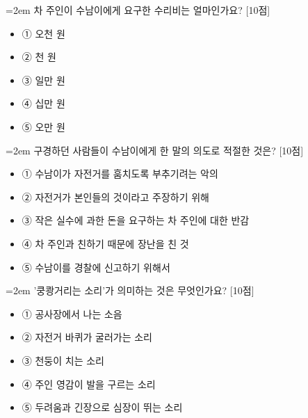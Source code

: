 \documentclass[12pt,a4paper]{article}
\newcommand{\qnum}[1]{%
  \tikz[baseline=(num.base)]{%
    \node[circle, fill=numCircle, text=white, inner sep=0pt,
          minimum size=18pt, font=\small\bfseries] (num) {#1};%
  }%
}
\newcommand{\pts}[1]{%
  \hfill\textcolor{ptsBadge}{[#1점]}%
}
\begin{document}
\vspace{4mm}
\begin{minipage}{\columnwidth}
{\hangindent=2em
\qnum{5}\enspace 차 주인이 수남이에게 요구한 수리비는 얼마인가요? \pts{10}
\par}

\vspace{3mm}
\begin{itemize}[leftmargin=2.5em, labelsep=0.3em, label={}, itemsep=4pt, parsep=1pt, topsep=0pt]
  \item ① 오천 원
  \item ② 천 원
  \item ③ 일만 원
  \item ④ 십만 원
  \item ⑤ 오만 원
\end{itemize}
\end{minipage}
\vspace{4mm}

\vspace{4mm}
\begin{minipage}{\columnwidth}
{\hangindent=2em
\qnum{6}\enspace 구경하던 사람들이 수남이에게 한 말의 의도로 적절한 것은? \pts{10}
\par}

\vspace{3mm}
\begin{itemize}[leftmargin=2.5em, labelsep=0.3em, label={}, itemsep=4pt, parsep=1pt, topsep=0pt]
  \item ① 수남이가 자전거를 훔치도록 부추기려는 악의
  \item ② 자전거가 본인들의 것이라고 주장하기 위해
  \item ③ 작은 실수에 과한 돈을 요구하는 차 주인에 대한 반감
  \item ④ 차 주인과 친하기 때문에 장난을 친 것
  \item ⑤ 수남이를 경찰에 신고하기 위해서
\end{itemize}
\end{minipage}
\vspace{4mm}

\vspace{4mm}
\begin{minipage}{\columnwidth}
{\hangindent=2em
\qnum{7}\enspace '쿵쾅거리는 소리'가 의미하는 것은 무엇인가요? \pts{10}
\par}

\vspace{3mm}
\begin{itemize}[leftmargin=2.5em, labelsep=0.3em, label={}, itemsep=4pt, parsep=1pt, topsep=0pt]
  \item ① 공사장에서 나는 소음
  \item ② 자전거 바퀴가 굴러가는 소리
  \item ③ 천둥이 치는 소리
  \item ④ 주인 영감이 발을 구르는 소리
  \item ⑤ 두려움과 긴장으로 심장이 뛰는 소리
\end{itemize}
\end{minipage}
\vspace{4mm}
\end{document}
